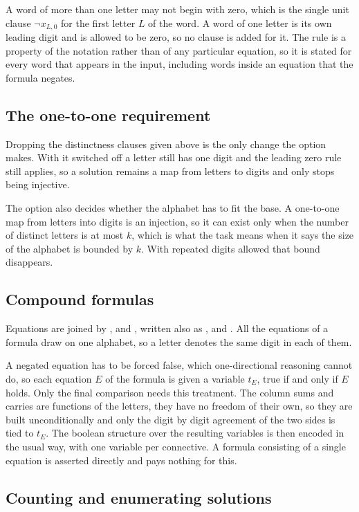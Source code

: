 \documentclass[11pt,a4paper]{article}
\begin{document}
A word of more than one letter may not begin with zero, which is the single
unit clause $\neg x_{L,0}$ for the first letter $L$ of the word. A word of one
letter is its own leading digit and is allowed to be zero, so no clause is
added for it. The rule is a property of the notation rather than of any
particular equation, so it is stated for every word that appears in the input,
including words inside an equation that the formula negates.

\subsection*{The one-to-one requirement}

Dropping the distinctness clauses given above is the only change the option
makes. With it switched off a letter still has one digit and the leading zero
rule still applies, so a solution remains a map from letters to digits and only
stops being injective.

The option also decides whether the alphabet has to fit the base. A one-to-one
map from letters into digits is an injection, so it can exist only when the
number of distinct letters is at most $k$, which is what the task means when
it says the size of the alphabet is bounded by $k$. With repeated digits
allowed that bound disappears.

\subsection*{Compound formulas}

Equations are joined by ,  and , written also as
\code{\&\&}, \code{||} and \code{!}. All the equations of a formula draw on one
alphabet, so a letter denotes the same digit in each of them.

A negated equation has to be forced false, which one-directional reasoning
cannot do, so each equation $E$ of the formula is given a variable $t_E$, true
if and only if $E$ holds. Only the final comparison needs this treatment. The
column sums and carries are functions of the letters, they have no freedom of
their own, so they are built unconditionally and only the digit by digit
agreement of the two sides is tied to $t_E$. The boolean structure over the
resulting variables is then encoded in the usual way, with one variable per
connective. A formula consisting of a single equation is asserted directly and
pays nothing for this.

\subsection*{Counting and enumerating solutions}
\end{document}
